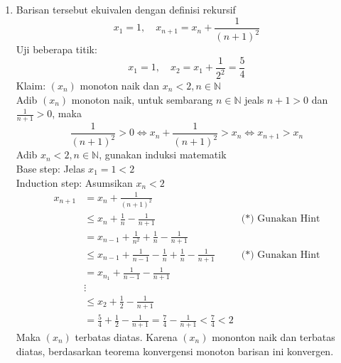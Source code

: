 \documentclass{article}
\begin{document}
\begin{enumerate}[leftmargin=*, label={\arabic*}.]
\item Barisan tersebut ekuivalen dengan definisi rekursif
\[
x_1 = 1,\quad x_{n+1} = x_n+\frac{1}{(n+1)^2}
\]
Uji beberapa titik:
\[
x_1 = 1, \quad x_2=x_1+\frac{1}{2^2} = \frac{5}{4}
\]
Klaim: $(x_n)$ monoton naik dan $x_n < 2, n \in \mathbb{N}$\\
Adib $(x_n)$ monoton naik, untuk sembarang $n \in \mathbb{N}$ jeals $n+1>0$ dan $\frac{1}{n+1} > 0$, maka
\[
\frac{1}{(n+1)^2} > 0 \iff x_n +\frac{1}{(n+1)^2} > x_n \iff x_{n+1} > x_n
\]
Adib $x_n < 2, n\in\mathbb{N}$, gunakan induksi matematik\\
Base step: Jelas $x_1 = 1 < 2$\\
Induction step: Asumsikan $x_n < 2$
\begin{align*}
    x_{n+1} &= x_n + \frac{1}{(n+1)^2}\\
    &\leq x_n + \frac{1}{n} - \frac{1}{n+1} &\text{(*) Gunakan Hint}\\
    &=x_{n-1} + \frac{1}{n^2} + \frac{1}{n} - \frac{1}{n+1}\\
    &\leq x_{n-1} + \frac{1}{n-1} - \frac{1}{n} + \frac{1}{n} - \frac{1}{n+1} &\text{(*) Gunakan Hint}\\
    &= x_{n_1} + \frac{1}{n-1} - \frac{1}{n+1}\\
    &\vdots\\
    &\leq x_2 + \frac{1}{2} - \frac{1}{n+1}\\
    &=\frac{5}{4} + \frac{1}{2} - \frac{1}{n+1} = \frac{7}{4} - \frac{1}{n+1} < \frac{7}{4} < 2
\end{align*}
Maka $(x_n)$ terbatas diatas. Karena $(x_n)$ mononton naik dan terbatas diatas, berdasarkan teorema konvergensi monoton 
barisan ini konvergen.


\end{enumerate}
\end{document}
